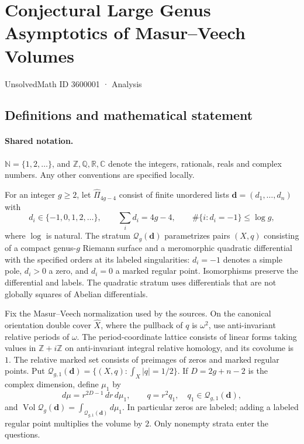 \documentclass[11pt]{article}
\begin{document}
\setcounter{section}{3600000}
\section{Conjectural Large Genus Asymptotics of Masur–Veech Volumes}\label{3600001}
{\small\sffamily UnsolvedMath ID 3600001 · Analysis}
\subsection{Definitions and mathematical statement}

\paragraph{Shared notation.}$\mathbb N=\{1,2,\ldots\}$, and $\mathbb Z,\mathbb Q,\mathbb R,\mathbb C$ denote the integers, rationals, reals and complex numbers. Any other conventions are specified locally.


For an integer $g\ge2$, let $\widehat\Pi_{4g-4}$ consist of finite unordered lists $\boldsymbol d=(d_1,\ldots,d_n)$ with
\[
 d_i\in\{-1,0,1,2,\ldots\},\qquad\sum_i d_i=4g-4,\qquad
 \#\{i:d_i=-1\}\le\log g,
\]
where $\log$ is natural. The stratum $\mathcal Q_g(\boldsymbol d)$ parametrizes pairs $(X,q)$ consisting of a compact genus-$g$ Riemann surface and a meromorphic quadratic differential with the specified orders at its labeled singularities: $d_i=-1$ denotes a simple pole, $d_i>0$ a zero, and $d_i=0$ a marked regular point. Isomorphisms preserve the differential and labels. The quadratic stratum uses differentials that are not globally squares of Abelian differentials.

Fix the Masur--Veech normalization used by the sources. On the canonical orientation double cover $\widehat X$, where the pullback of $q$ is $\omega^2$, use anti-invariant relative periods of $\omega$. The period-coordinate lattice consists of linear forms taking values in $\mathbb Z+i\mathbb Z$ on anti-invariant integral relative homology, and its covolume is $1$. The relative marked set consists of preimages of zeros and marked regular points. Put $\mathcal Q_{g,1}(\boldsymbol d)=\{(X,q):\int_X|q|=1/2\}$. If $D=2g+n-2$ is the complex dimension, define $\mu_1$ by
\[
 d\mu=r^{2D-1}\,dr\,d\mu_1,\qquad q=r^2q_1,\quad q_1\in\mathcal Q_{g,1}(\boldsymbol d),
\]
and $\operatorname{Vol}\mathcal Q_g(\boldsymbol d)=\int_{\mathcal Q_{g,1}(\boldsymbol d)}d\mu_1$. In particular zeros are labeled; adding a labeled regular point multiplies the volume by $2$. Only nonempty strata enter the questions.
\end{document}
